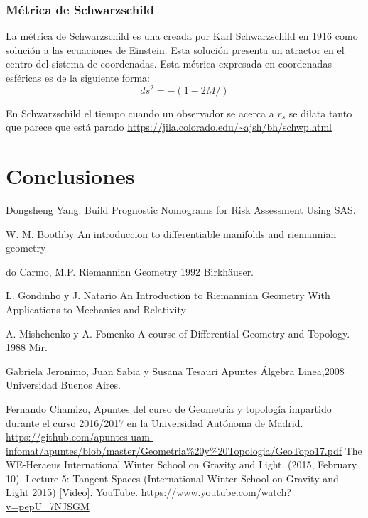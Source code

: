 \documentclass[pdftex,11pt,a4paper]{book}
\begin{document}
\subsection{Métrica de Schwarzschild}
La métrica de Schwarzschild es una creada por Karl Schwarzschild en 1916 como solución a las ecuaciones de Einstein. Esta solución presenta  un atractor en el centro del sistema de coordenadas. 
Esta métrica expresada en coordenadas esféricas es de la siguiente forma: 
\begin{equation}
    ds^2= -(1-2M/)
\end{equation}


En Schwarzschild el tiempo cuando un observador se acerca a $r_s$ se dilata tanto que parece que está parado \url{https://jila.colorado.edu/~ajsh/bh/schwp.html}




\chapter{Conclusiones}








\begin{thebibliography}{}

 Dongsheng Yang. Build Prognostic Nomograms for Risk Assessment Using SAS.

 W. M. Boothby An introduccion to differentiable manifolds and riemannian geometry 

 do Carmo, M.P. Riemannian Geometry 1992 Birkh{\"a}user.

 L. Gondinho y J. Natario An Introduction to Riemannian Geometry With Applications to Mechanics and Relativity

 A. Mishchenko y A. Fomenko A course of Differential Geometry and Topology. 1988 Mir. 

 Gabriela Jeronimo, Juan Sabia y Susana Tesauri Apuntes Álgebra Linea,2008 Universidad Buenos Aires.

 Fernando Chamizo, Apuntes del curso de Geometría y topología impartido durante el curso 2016/2017 en la Universidad Autónoma de Madrid. \url{https://github.com/apuntes-uam-infomat/apuntes/blob/master/Geometria%20y%20Topologia/GeoTopo17.pdf} 
The WE-Heraeus International Winter School on Gravity and Light. (2015, February 10). Lecture 5: Tangent Spaces (International Winter School on Gravity and Light 2015) [Video]. YouTube. \url{https://www.youtube.com/watch?v=pepU_7NJSGM}


\end{thebibliography}
\end{document}
